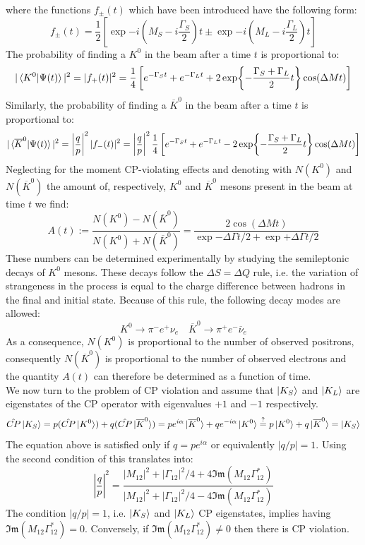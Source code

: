 \documentclass[../main.tex]{subfiles}
\begin{document}
where the functions $f_\pm(t)$ which have been introduced have the following form:
\[
f_\pm(t)=\frac{1}{2}\left[\exp{-i\left(M_S-i\frac{\Gamma_S}{2}\right)t}\pm\exp{-i\left(M_L-i\frac{\Gamma_L}{2}\right)t}\right]
\]
The probability of finding a $K^0$ in the beam after a time $t$ is proportional to:
\[
|\braket{K^0|\Psi(t)}|^2=|f_+(t)|^2=\frac{1}{4}\left[e^{-\Gamma_St}+e^{-\Gamma_Lt}+2\exp{-\frac{\Gamma_S+\Gamma_L}{2}t}\cos(\Delta Mt)\right]
\]
Similarly, the probability of finding a $\overline{K}^0$ in the beam after a time $t$ is proportional to:
\[
|\braket{\overline{K}^0|\Psi(t)}|^2=\left|\frac{q}{p}\right|^2|f_-(t)|^2=\left|\frac{q}{p}\right|^2\frac{1}{4}\left[e^{-\Gamma_St}+e^{-\Gamma_Lt}-2\exp{-\frac{\Gamma_S+\Gamma_L}{2}t}\cos(\Delta Mt)\right]
\]
Neglecting for the moment CP-violating effects and denoting with $N(K^0)$ and $N(\overline{K}^0)$ the amount of, respectively, $K^0$ and $\overline{K}^0$ mesons present in the beam at time $t$ we find:
\[
A(t):=\frac{N(K^0)-N(\overline{K}^0)}{N(K^0)+N(\overline{K}^0)}=\frac{2\cos(\Delta Mt)}{\exp{-\Delta\Gamma t/2}+\exp{+\Delta\Gamma t/2}}
\]
These numbers can be determined experimentally by studying the semileptonic decays of $K^0$ mesons. These decays follow the $\Delta S=\Delta Q$ rule, i.e. the variation of strangeness in the process is equal to the charge difference between hadrons in the final and initial state. Because of this rule, the following decay modes are allowed:
\[
K^0\to\pi^-e^+\nu_e \quad \overline{K}^0\to\pi^+e^-\overline{\nu}_e
\]
As a consequence, $N(K^0)$ is proportional to the number of observed positrons, consequently $N(\overline{K}^0)$ is proportional to the number of observed electrons and the quantity $A(t)$ can therefore be determined as a function of time.\\
We now turn to the problem of CP violation and assume that $\ket{K_S}$ and $\ket{K_L}$ are eigenstates of the CP operator with eigenvalues $+1$ and $-1$ respectively.
\[
\hat{CP}\ket{K_S}=p(\hat{CP}\ket{K^0})+q(\hat{CP}\ket{\overline{K}^0})=pe^{i\alpha}\ket{\overline{K}^0}+qe^{-i\alpha}\ket{K^0}\stackrel{?}{=}p\ket{K^0}+q\ket{\overline{K}^0}=\ket{K_S}
\]
The equation above is satisfied only if $q=pe^{i\alpha}$ or equivalently $|q/p|=1$. Using the second condition of  this translates into:
\[
\left|\frac{q}{p}\right|^2=\frac{|M_{12}|^2+|\Gamma_{12}|^2/4+4\mathfrak{Im}(M_{12}\Gamma_{12}^*)}{|M_{12}|^2+|\Gamma_{12}|^2/4-4\mathfrak{Im}(M_{12}\Gamma_{12}^*)}
\]
The condition $|q/p|=1$, i.e. $\ket{K_S}$ and $\ket{K_L}$ CP eigenstates, implies having $\mathfrak{Im}(M_{12}\Gamma_{12}^*)=0$. Conversely, if $\mathfrak{Im}(M_{12}\Gamma_{12}^*)\neq0$ then there is CP violation.\\
\end{document}
